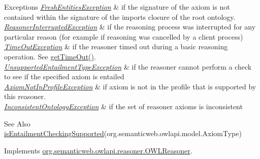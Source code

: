 \begin{DoxyExceptions}{Exceptions}
{\em \hyperlink{classorg_1_1semanticweb_1_1owlapi_1_1reasoner_1_1_fresh_entities_exception}{Fresh\-Entities\-Exception}} & if the signature of the axiom is not contained within the signature of the imports closure of the root ontology. \\
\hline
{\em \hyperlink{classorg_1_1semanticweb_1_1owlapi_1_1reasoner_1_1_reasoner_interrupted_exception}{Reasoner\-Interrupted\-Exception}} & if the reasoning process was interrupted for any particular reason (for example if reasoning was cancelled by a client process) \\
\hline
{\em \hyperlink{classorg_1_1semanticweb_1_1owlapi_1_1reasoner_1_1_time_out_exception}{Time\-Out\-Exception}} & if the reasoner timed out during a basic reasoning operation. See \hyperlink{classorg_1_1semanticweb_1_1owlapi_1_1reasoner_1_1impl_1_1_o_w_l_reasoner_base_af55342eaaabb1b72dacfde7a181b93d2}{get\-Time\-Out()}. \\
\hline
{\em \hyperlink{classorg_1_1semanticweb_1_1owlapi_1_1reasoner_1_1_unsupported_entailment_type_exception}{Unsupported\-Entailment\-Type\-Exception}} & if the reasoner cannot perform a check to see if the specified axiom is entailed \\
\hline
{\em \hyperlink{classorg_1_1semanticweb_1_1owlapi_1_1reasoner_1_1_axiom_not_in_profile_exception}{Axiom\-Not\-In\-Profile\-Exception}} & if {\ttfamily axiom} is not in the profile that is supported by this reasoner. \\
\hline
{\em \hyperlink{classorg_1_1semanticweb_1_1owlapi_1_1reasoner_1_1_inconsistent_ontology_exception}{Inconsistent\-Ontology\-Exception}} & if the set of reasoner axioms is inconsistent \\
\hline
\end{DoxyExceptions}
\begin{DoxySeeAlso}{See Also}
\hyperlink{classorg_1_1semanticweb_1_1owlapi_1_1reasoner_1_1structural_1_1_structural_reasoner_a275ef13de2d55b0123ff94bce52ea78b}{is\-Entailment\-Checking\-Supported}(org.\-semanticweb.\-owlapi.\-model.\-Axiom\-Type) 
\end{DoxySeeAlso}


Implements \hyperlink{interfaceorg_1_1semanticweb_1_1owlapi_1_1reasoner_1_1_o_w_l_reasoner_a078ec0ac44d288edd2b7747e5790d1d3}{org.\-semanticweb.\-owlapi.\-reasoner.\-O\-W\-L\-Reasoner}.

